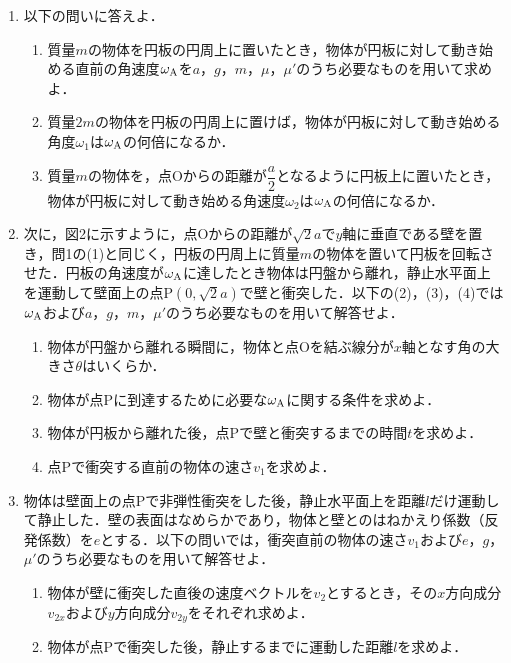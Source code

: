 \begin{enumerate}[label=\textbf{問\arabic*}]
  \item {\hzw}以下の問いに答えよ．
  \begin{enumerate}[(1)]
    \item {\hzw}質量$m$の物体を円板の円周上に置いたとき，物体が円板に対して動き始める直前の角速度$\omega_\mathrm{A}$を$a$，$g$，$m$，$\mu$，$\mu'$のうち必要なものを用いて求めよ．
    \item {\hzw}質量$2m$の物体を円板の円周上に置けば，物体が円板に対して動き始める角度$\omega_1$は$\omega_\mathrm{A}$の何倍になるか．
    \item {\hzw}質量$m$の物体を，点Oからの距離が$\dfrac{a}{2}$となるように円板上に置いたとき，物体が円板に対して動き始める角速度$\omega_2$は$\omega_\mathrm{A}$の何倍になるか．
  \end{enumerate}
  \item {\hzw}次に，図2に示すように，点Oからの距離が$\sqrt{2}a$で$y$軸に垂直である壁を置き，問1の(1)と同じく，円板の円周上に質量$m$の物体を置いて円板を回転させた．円板の角速度が$\omega_\mathrm{A}$に達したとき物体は円盤から離れ，静止水平面上を運動して壁面上の点P$(0, \sqrt{2}a)$で壁と衝突した．以下の(2)，(3)，(4)では$\omega_\mathrm{A}$および$a$，$g$，$m$，$\mu'$のうち必要なものを用いて解答せよ．
  \begin{enumerate}[(1)]
    \item {\hzw}物体が円盤から離れる瞬間に，物体と点Oを結ぶ線分が$x$軸となす角の大きさ$\theta$はいくらか．
    \item {\hzw}物体が点Pに到達するために必要な$\omega_\mathrm{A}$に関する条件を求めよ．
    \item {\hzw}物体が円板から離れた後，点Pで壁と衝突するまでの時間$t$を求めよ．
    \item {\hzw}点Pで衝突する直前の物体の速さ$v_1$を求めよ．
  \end{enumerate}
  \item {\hzw}物体は壁面上の点Pで非弾性衝突をした後，静止水平面上を距離$l$だけ運動して静止した．壁の表面はなめらかであり，物体と壁とのはねかえり係数（反発係数）を$e$とする．以下の問いでは，衝突直前の物体の速さ$v_1$および$e$，$g$，$\mu'$のうち必要なものを用いて解答せよ．
  \begin{enumerate}[(1)]
    \item {\hzw}物体が壁に衝突した直後の速度ベクトルを$v_2$とするとき，その$x$方向成分$v_{2x}$および$y$方向成分$v_{2y}$をそれぞれ求めよ．
    \item {\hzw}物体が点Pで衝突した後，静止するまでに運動した距離$l$を求めよ．
  \end{enumerate}
\end{enumerate}
